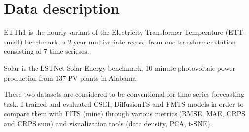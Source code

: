 \section{Data description}

ETTh1 \cite{zhou2021informer,zhouhaoyiETDataset} is the hourly variant of the Electricity Transformer Temperature (ETT-small) benchmark, a 2-year multivariate record from one transformer station consisting of $7$ time-serieses.

Solar \cite{lai2017lstnet,laiguokunMTSdata} is the LSTNet Solar-Energy benchmark, 10-minute photovoltaic power production from $137$ PV plants in Alabama.

These two datasets are considered to be conventional for time series forecasting task. I trained and evaluated CSDI, DiffusionTS and FMTS models in order to compare them with FITS (mine) through various metrics (RMSE, MAE, CRPS and CRPS sum) and visualization tools (data density, PCA, t-SNE).
